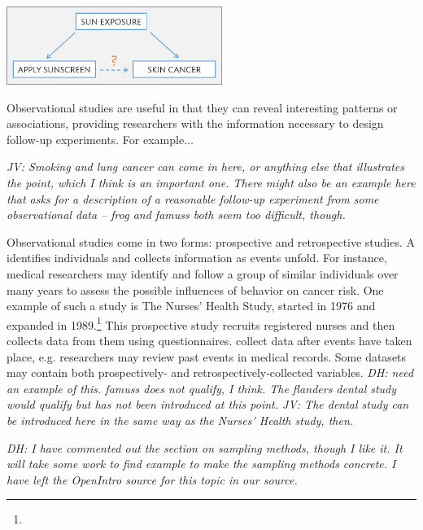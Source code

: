 \begin{doublespace}
\begin{center}
	\includegraphics[height=1.0in]{ch_intro_to_data_oi_biostat/figures/variables/sunCausesCancer.png}
\end{center}

Observational studies are useful in that they can reveal interesting patterns or associations, providing researchers with the information necessary to design follow-up experiments. For example...

\textit{JV: Smoking and lung cancer can come in here, or anything else that illustrates the point, which I think is an important one. There might also be an example here that asks for a description of a reasonable follow-up experiment from some observational data -- frog and famuss both seem too difficult, though.}

Observational studies come in two forms: prospective and retrospective studies. A  identifies individuals and collects information as events unfold. For instance, medical researchers may identify and follow a group of similar individuals over many years to assess the possible influences of behavior on cancer risk. One example of such a study is The Nurses' Health Study, started in 1976 and expanded in 1989.\footnote{\texttt{}} This prospective study recruits registered nurses and then collects data from them using questionnaires.  collect data after events have taken place, e.g. researchers may review past events in medical records. Some datasets may contain both prospectively- and retrospectively-collected variables. \textit{DH: need an example of this.  famuss does not qualify, I think.  The flanders dental study would qualify but has not been introduced at this point. JV: The dental study can be introduced here in the same way as the Nurses' Health study, then.}

\textit{DH: I have commented out the section on sampling methods, though I like it.  It will take some work to find example to make the sampling methods concrete. I have left the OpenIntro source for this topic in our source.}

\end{doublespace}

